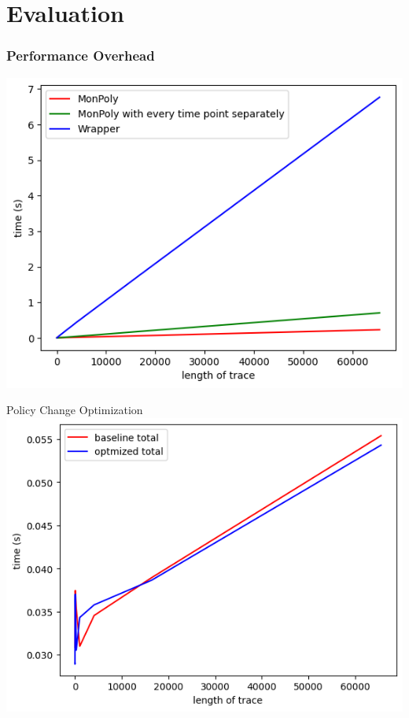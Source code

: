 \section{Evaluation}

\begin{frame}
    \frametitle{Performance Overhead}
    \centering
    \includegraphics[width=0.9\linewidth]{diagrams/wrapper-monpoly-total.png}
\end{frame}


\begin{frame}{Policy Change Optimization}
    \centering
    \includegraphics[width=0.9\linewidth]{diagrams/policy-change-total-time.png}
\end{frame}